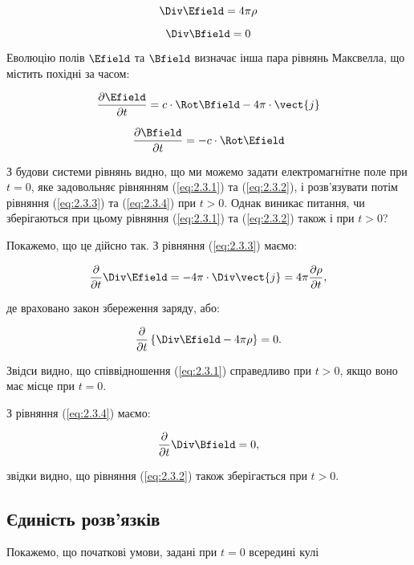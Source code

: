\begin{equation}
\Div \Efield = 4\pi\rho \label{eq:2.3.1}
\end{equation}

\begin{equation}
\Div \Bfield = 0 \label{eq:2.3.2}
\end{equation}

Еволюцію полів \( \Efield \) та \( \Bfield \) визначає інша пара рівнянь Максвелла, що містить похідні за часом:

\begin{equation}
\frac{\partial \Efield}{\partial t} = c \cdot \Rot \Bfield - 4\pi \cdot \vect{j} \label{eq:2.3.3}
\end{equation}

\begin{equation}
\frac{\partial \Bfield}{\partial t} = -c \cdot \Rot \Efield \label{eq:2.3.4}
\end{equation}

З будови системи рівнянь видно, що ми можемо задати електромагнітне поле при \( t = 0 \), яке задовольняє рівнянням (\ref{eq:2.3.1}) та
(\ref{eq:2.3.2}), і розв’язувати потім рівняння (\ref{eq:2.3.3}) та (\ref{eq:2.3.4}) при \( t > 0 \). Однак виникає питання, чи зберігаються при цьому
рівняння (\ref{eq:2.3.1}) та (\ref{eq:2.3.2}) також і при \( t > 0 \)?

Покажемо, що це дійсно так. З рівняння (\ref{eq:2.3.3}) маємо:

\[
\frac{\partial}{\partial t} \Div \Efield = -4\pi \cdot \Div \vect{j} = 4\pi \frac{\partial \rho}{\partial t},
\]

де враховано закон збереження заряду, або:

\[
\frac{\partial}{\partial t} \left\{ \Div \Efield - 4\pi\rho \right\} = 0.
\]

Звідси видно, що співвідношення (\ref{eq:2.3.1}) справедливо при \( t > 0 \), якщо воно має місце при \( t = 0 \).

З рівняння (\ref{eq:2.3.4}) маємо:

\[
\frac{\partial}{\partial t} \Div \Bfield = 0,
\]

звідки видно, що рівняння (\ref{eq:2.3.2}) також зберігається при \( t > 0 \).

\subsection*{Єдиність розв’язків}

Покажемо, що початкові умови, задані при \( t = 0 \) всередині кулі

